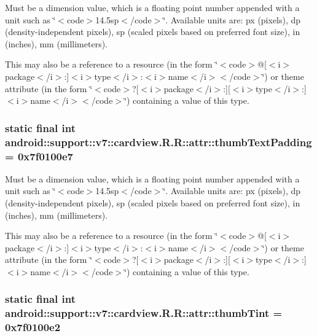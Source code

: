 Must be a dimension value, which is a floating point number appended with a unit such as \char`\"{}$<$code$>$14.5sp$<$/code$>$\char`\"{}. Available units are: px (pixels), dp (density-independent pixels), sp (scaled pixels based on preferred font size), in (inches), mm (millimeters). 

This may also be a reference to a resource (in the form \char`\"{}$<$code$>$@\mbox{[}$<$i$>$package$<$/i$>$:\mbox{]}$<$i$>$type$<$/i$>$:$<$i$>$name$<$/i$>$$<$/code$>$\char`\"{}) or theme attribute (in the form \char`\"{}$<$code$>$?\mbox{[}$<$i$>$package$<$/i$>$:\mbox{]}\mbox{[}$<$i$>$type$<$/i$>$:\mbox{]}$<$i$>$name$<$/i$>$$<$/code$>$\char`\"{}) containing a value of this type. \hypertarget{classandroid_1_1support_1_1v7_1_1cardview_1_1_r_1_1attr_a8eafa89662c598222b5bc2bcf02112e}{
\subsubsection[{thumbTextPadding}]{\setlength{\rightskip}{0pt plus 5cm}static final int android::support::v7::cardview.R.R::attr::thumbTextPadding = 0x7f0100e7}}
\label{classandroid_1_1support_1_1v7_1_1cardview_1_1_r_1_1attr_a8eafa89662c598222b5bc2bcf02112e}


Must be a dimension value, which is a floating point number appended with a unit such as \char`\"{}$<$code$>$14.5sp$<$/code$>$\char`\"{}. Available units are: px (pixels), dp (density-independent pixels), sp (scaled pixels based on preferred font size), in (inches), mm (millimeters). 

This may also be a reference to a resource (in the form \char`\"{}$<$code$>$@\mbox{[}$<$i$>$package$<$/i$>$:\mbox{]}$<$i$>$type$<$/i$>$:$<$i$>$name$<$/i$>$$<$/code$>$\char`\"{}) or theme attribute (in the form \char`\"{}$<$code$>$?\mbox{[}$<$i$>$package$<$/i$>$:\mbox{]}\mbox{[}$<$i$>$type$<$/i$>$:\mbox{]}$<$i$>$name$<$/i$>$$<$/code$>$\char`\"{}) containing a value of this type. \hypertarget{classandroid_1_1support_1_1v7_1_1cardview_1_1_r_1_1attr_b423e0a38f6e42633de575fad529148c}{
\subsubsection[{thumbTint}]{\setlength{\rightskip}{0pt plus 5cm}static final int android::support::v7::cardview.R.R::attr::thumbTint = 0x7f0100e2}}
\label{classandroid_1_1support_1_1v7_1_1cardview_1_1_r_1_1attr_b423e0a38f6e42633de575fad529148c}


